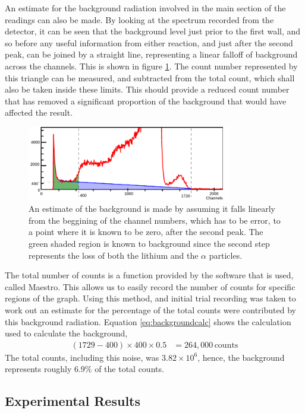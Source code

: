 An estimate for the background radiation involved in the main section of the readings can also be made. By looking at the spectrum recorded from the detector, it can be seen that the background level just prior to the first wall, and so before any useful information from either reaction, and just after the second peak, can be joined by a straight line, representing a linear falloff of background across the channels. This is shown in figure \ref{fig:bf3errorest}. The count number represented by this triangle can be measured, and subtracted from the total count, which shall also be taken inside these limits. This should provide a reduced count number that has removed a significant proportion of the background that would have affected the result.
\begin{figure}[ht]
  \centering
  \includegraphics[width=0.8\textwidth]{BF3background.pdf}
  \caption{An estimate of the background is made by assuming it falls linearly from the beggining of the channel numbers, which has to be error, to a point where it is known to be zero, after the second peak. The green shaded region is known to background since the second step represents the loss of both the lithium and the $\alpha$ particles. \label{fig:bf3errorest}}
\end{figure}

The total number of counts is a function provided by the software that is used, called Maestro. This allows us to easily record the number of counts for specific regions of the graph. Using this method, and initial trial recording was taken to work out an estimate for the percentage of the total counts were contributed by this background radiation. Equation \ref{eq:backgroundcalc} shows the calculation used to calculate the background,
\begin{align}
  (1729-400)\times 400 \times 0.5 &= 264,000\,\text{counts} \label{eq:backgroundcalc}
\end{align}
The total counts, including this noise, was $3.82\times10^6$, hence, the background represents roughly 6.9\% of the total counts.
\subsection{Experimental Results} %
\label{sub:bf3experimental_results}

